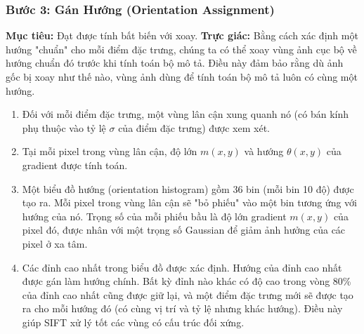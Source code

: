 \subsubsection{Bước 3: Gán Hướng (Orientation Assignment)}
\label{subsubsec:sift_orientation}
\textbf{Mục tiêu:} Đạt được tính bất biến với xoay.
\textbf{Trực giác:} Bằng cách xác định một hướng "chuẩn" cho mỗi điểm đặc trưng, chúng ta có thể xoay vùng ảnh cục bộ về hướng chuẩn đó trước khi tính toán bộ mô tả. Điều này đảm bảo rằng dù ảnh gốc bị xoay như thế nào, vùng ảnh dùng để tính toán bộ mô tả luôn có cùng một hướng.

\begin{enumerate}
    \item Đối với mỗi điểm đặc trưng, một vùng lân cận xung quanh nó (có bán kính phụ thuộc vào tỷ lệ $\sigma$ của điểm đặc trưng) được xem xét.
    \item Tại mỗi pixel trong vùng lân cận, độ lớn $m(x,y)$ và hướng $\theta(x,y)$ của gradient được tính toán.
    \item Một biểu đồ hướng (orientation histogram) gồm 36 bin (mỗi bin 10 độ) được tạo ra. Mỗi pixel trong vùng lân cận sẽ "bỏ phiếu" vào một bin tương ứng với hướng của nó. Trọng số của mỗi phiếu bầu là độ lớn gradient $m(x,y)$ của pixel đó, được nhân với một trọng số Gaussian để giảm ảnh hưởng của các pixel ở xa tâm.
    \item Các đỉnh cao nhất trong biểu đồ được xác định. Hướng của đỉnh cao nhất được gán làm hướng chính. Bất kỳ đỉnh nào khác có độ cao trong vòng 80\% của đỉnh cao nhất cũng được giữ lại, và một điểm đặc trưng mới sẽ được tạo ra cho mỗi hướng đó (có cùng vị trí và tỷ lệ nhưng khác hướng). Điều này giúp SIFT xử lý tốt các vùng có cấu trúc đối xứng.
\end{enumerate}

